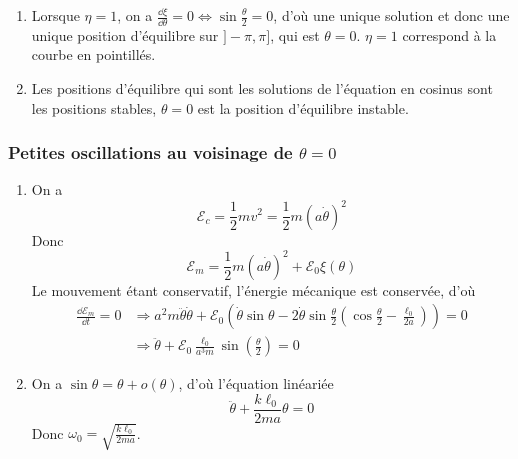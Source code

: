 \documentclass[17pt]{article}
\def\Em{\mathcal{E}_m}
\def\Ec{\mathcal{E}_c}
\def\ssi{\Leftrightarrow}
\def\implique{\Longrightarrow}
\begin{document}
\begin{enumerate}[start=4]
\begin{align*}
										&\ssi \eta\sin\theta -\sin\theta+\frac{\ell_0}{a}\sin\frac\theta2=0\\
										&\ssi (\eta-1)\sin\theta+\frac{\ell_0}{a}\sin\frac\theta2=0\\
										&\ssi \sin\theta=\frac{\ell_0}{a(1-\eta)}\sin\frac\theta2\\
										&\ssi 2\sin\frac\theta2\cos\frac\theta2=\frac{\ell_0}{a(1-\eta)}\sin\frac\theta2\\
										&\ssi\boxed{\left(\sin\frac\theta2=0\right)\ \vee \ \left(\cos\frac\theta2=\frac{\ell_0}{2a(1-\eta)}\right)}
		\end{align*}
		Dans $]-\pi,\pi]$, il n'y a qu'une solution pour l'équation avec le sinus, qui est $\theta=0$. Pour l'équation avec le cosinus, comme $0\leq\frac{\ell_0}{2a(1-\eta)}<1$, on trouve deux solutions (d'abord avec $\arccos$ sur $[0,\pi[$, ensuite par parité de $\cos$.)
		\item Lorsque $\eta=1$, on a $\frac{\dd\xi}{\dd\theta}=0 \ssi\sin\frac\theta2=0$, d'où une unique solution et donc une unique position d'équilibre sur $]-\pi,\pi]$, qui est $\theta=0$. $\eta=1$ correspond à la courbe en pointillés.
		\item Les positions d'équilibre qui sont les solutions de l'équation en cosinus sont les positions stables, $\theta=0$ est la position d'équilibre instable.
	\end{enumerate}

	\subsubsection*{Petites oscillations au voisinage de $\theta=0$}
	\begin{enumerate}[start=9]
		\item On a \[\Ec=\frac12mv^2=\frac12m(a\dot{\theta})^2\]
		Donc \[\Em=\frac12m(a\dot{\theta})^2+\mathcal{E}_0\xi(\theta)\]
		Le mouvement étant conservatif, l'énergie mécanique est conservée, d'où
		\begin{align*}
			\frac{\dd\Em}{\dd t}=0 &\implique a^2m\ddot{\theta}\dot{\theta}+\mathcal{E}_0\left(\dot{\theta}\sin\theta-2\dot{\theta}\sin\frac\theta2\left(\cos\frac\theta2-\frac{\ell_0}{2a}\right)\right)=0\\
								   &\implique \boxed{\ddot{\theta}+\mathcal{E}_0\frac{\ell_0}{a^3m}\sin\left(\frac\theta2\right)=0}
		\end{align*}
		\item On a $\sin\theta=\theta+o(\theta)$, d'où l'équation linéariée \[\ddot{\theta}+\frac{k\ell_0}{2ma}\theta=0\tag{E}\]
		Donc $\boxed{\omega_0=\sqrt{\frac{k\ell_0}{2ma}}}$.
	\end{enumerate}
\end{document}
